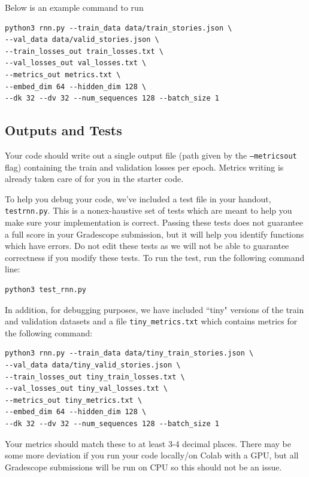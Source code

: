 \documentclass[11pt,addpoints,answers]{exam}
\begin{document}
Below is an example command to run

\begin{lstlisting}
python3 rnn.py --train_data data/train_stories.json \
--val_data data/valid_stories.json \
--train_losses_out train_losses.txt \ 
--val_losses_out val_losses.txt \
--metrics_out metrics.txt \
--embed_dim 64 --hidden_dim 128 \
--dk 32 --dv 32 --num_sequences 128 --batch_size 1 
\end{lstlisting}
\vspace{0.2 in}

\subsection{Outputs and Tests} 
Your code should write out a single output file (path given by the \texttt{--metrics\textunderscore out} flag) containing the train and validation losses per epoch. Metrics writing is already taken care of for you in the starter code.

To help you debug your code, we’ve included a test file in your handout, \texttt{test\textunderscore rnn.py}. This is a nonex-haustive set of tests which are meant to help you make sure your implementation is correct. Passing these tests does not guarantee a full score in your Gradescope submission, but it will help you identify functions which have errors. Do not edit these tests as we will not be able to guarantee correctness if you modify these tests. To run the test, run the following command line:
\begin{lstlisting}[language=Shell]
python3 test_rnn.py
\end{lstlisting}

In addition, for debugging purposes, we have included ``tiny" versions of the train and validation datasets and a file \texttt{tiny\_metrics.txt} which contains metrics for the following command:
\begin{lstlisting}
python3 rnn.py --train_data data/tiny_train_stories.json \
--val_data data/tiny_valid_stories.json \
--train_losses_out tiny_train_losses.txt \ 
--val_losses_out tiny_val_losses.txt \
--metrics_out tiny_metrics.txt \
--embed_dim 64 --hidden_dim 128 \
--dk 32 --dv 32 --num_sequences 128 --batch_size 1 
\end{lstlisting}

Your metrics should match these to at least 3-4 decimal places. There may be some more deviation if you run your code locally/on Colab with a GPU, but all Gradescope submissions will be run on CPU so this should not be an issue.
\end{document}
